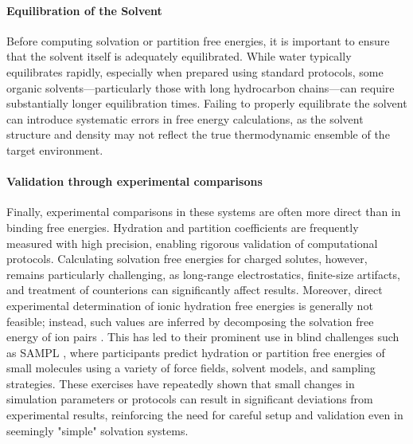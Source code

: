 \documentclass[9pt,bestpractices]{livecoms}
\begin{document}
\paragraph{Equilibration of the Solvent}
Before computing solvation or partition free energies, it is important to ensure that the solvent itself is adequately equilibrated. While water typically equilibrates rapidly, especially when prepared using standard protocols, some organic solvents—particularly those with long hydrocarbon chains—can require substantially longer equilibration times\cite{fan2021sampl7}. Failing to properly equilibrate the solvent can introduce systematic errors in free energy calculations, as the solvent structure and density may not reflect the true thermodynamic ensemble of the target environment\cite{zhang2017solventmodel}.



\paragraph{Validation through experimental comparisons}  
Finally, experimental comparisons in these systems are often more direct than in binding free energies. Hydration and partition coefficients are frequently measured with high precision, enabling rigorous validation of computational protocols. Calculating solvation free energies for charged solutes, however, remains particularly challenging, as long-range electrostatics, finite-size artifacts, and treatment of counterions can significantly affect results. Moreover, direct experimental determination of ionic hydration free energies is generally not feasible; instead, such values are inferred by decomposing the solvation free energy of ion pairs \cite{mobley2014freesolv}. This has led to their prominent use in blind challenges such as SAMPL \cite{skillman2012sampl3, mobley2014sampl4, bergazin2021sampl7}, where participants predict hydration or partition free energies of small molecules using a variety of force fields, solvent models, and sampling strategies. These exercises have repeatedly shown that small changes in simulation parameters or protocols can result in significant deviations from experimental results, reinforcing the need for careful setup and validation even in seemingly "simple" solvation systems.
\end{document}
